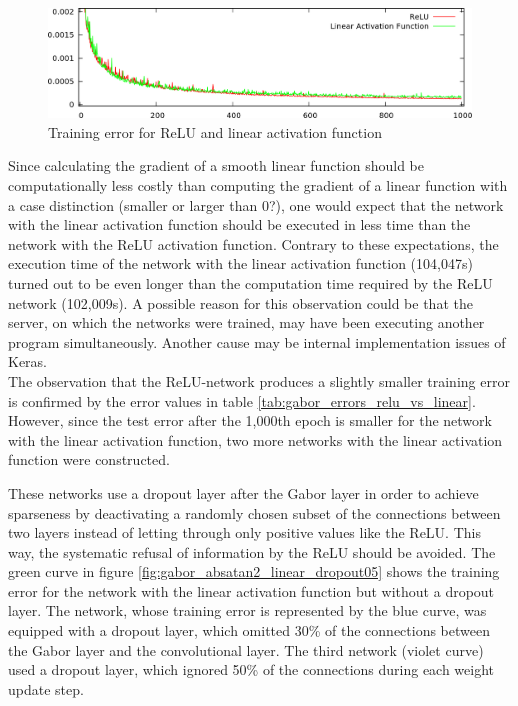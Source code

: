 \documentclass[11pt, a4paper]{article}
\begin{document}
\begin{figure}[h!]
	\centering
	\includegraphics[width=\textwidth]{images/results/gabor_absatan2_linear.png}
	\caption{Training error for ReLU and linear activation function}
	\label{fig:gabor_absatan2_linear}
\end{figure}
Since calculating the gradient of a smooth linear function should be computationally less costly than computing the gradient of a linear function with a case distinction (smaller or larger than $0$?), one would expect that the network with the linear activation function should be executed in less time than the network with the \ac{ReLU} activation function. Contrary to these expectations, the execution time of the network with the linear activation function (104,047s) turned out to be even longer than the computation time required by the \ac{ReLU} network (102,009s). A possible reason for this observation could be that the server, on which the networks were trained, may have been executing another program simultaneously. Another cause may be internal implementation issues of Keras.\\
The observation that the \ac{ReLU}-network produces a slightly smaller training error is confirmed by the error values in table \ref{tab:gabor_errors_relu_vs_linear}. However, since the test error after the 1,000th epoch is smaller for the network with the linear activation function, two more networks with the linear activation function were constructed.

These networks use a dropout layer after the Gabor layer in order to achieve sparseness by deactivating a randomly chosen subset of the connections between two layers instead of letting through only positive values like the \ac{ReLU}. This way, the systematic refusal of information by the \ac{ReLU} should be avoided. The green curve in figure \ref{fig:gabor_absatan2_linear_dropout05} shows the training error for the network with the linear activation function but without a dropout layer. The network, whose training error is represented by the blue curve, was equipped with a dropout layer, which omitted 30\% of the connections between the Gabor layer and the convolutional layer. The third network (violet curve) used a dropout layer, which ignored 50\% of the connections during each weight update step.
\end{document}
